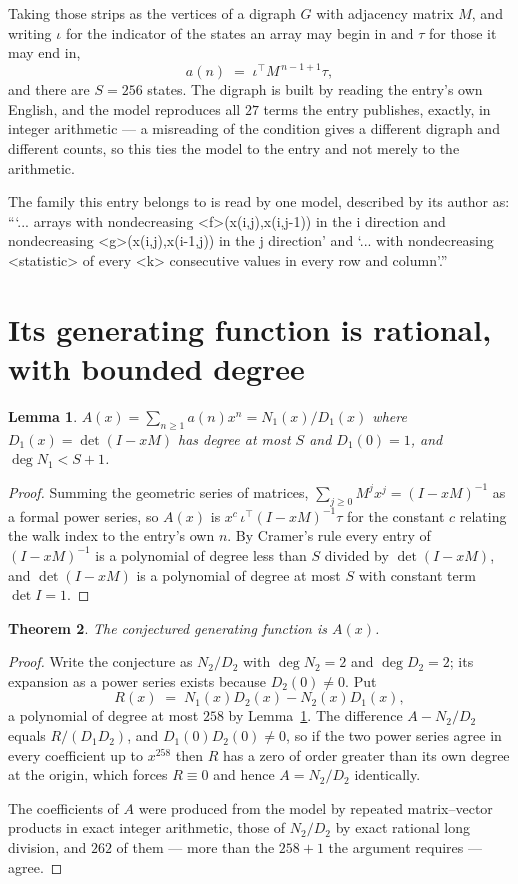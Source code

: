 \documentclass[11pt,a4paper]{article}
\theoremstyle{plain}
\newtheorem{theorem}{Theorem}
\newtheorem{lemma}[theorem]{Lemma}
\theoremstyle{definition}
\begin{document}
Taking those strips as the vertices of a digraph $G$ with adjacency matrix $M$, and writing
$\iota$ for the indicator of the states an array may begin in and $\tau$ for those it may end
in,
\[
a(n)\;=\;\iota^{\!\top}M^{\,n-1+1}\tau ,
\]
and there are $S=256$ states. The digraph is built by reading the entry's own English, and the
model reproduces all $27$ terms the entry publishes, exactly, in integer arithmetic --- a
misreading of the condition gives a different digraph and different counts, so this ties the
model to the entry and not merely to the arithmetic.

The family this entry belongs to is read by one model, described by its author as: ```... arrays with nondecreasing <f>(x(i,j),x(i,j-1)) in the i direction and nondecreasing <g>(x(i,j),x(i-1,j)) in the j direction' and `... with nondecreasing <statistic> of every <k> consecutive values in every row and column'.''


\section{Its generating function is rational, with bounded degree}

\begin{lemma}\label{lem:rat}
$A(x)=\sum_{n\ge1}a(n)x^n=N_1(x)/D_1(x)$ where $D_1(x)=\det(I-xM)$ has degree at most
$S$ and $D_1(0)=1$, and $\deg N_1<S+1$.
\end{lemma}

\begin{proof}
Summing the geometric series of matrices, $\sum_{j\ge0}M^jx^j=(I-xM)^{-1}$ as a formal
power series, so $A(x)$ is $x^{c}\,\iota^{\!\top}(I-xM)^{-1}\tau$ for the constant $c$
relating the walk index to the entry's own $n$. By Cramer's rule every entry of
$(I-xM)^{-1}$ is a polynomial of degree less than $S$ divided by $\det(I-xM)$, and
$\det(I-xM)$ is a polynomial of degree at most $S$ with constant term $\det I=1$.
\end{proof}

\begin{theorem}
The conjectured generating function is $A(x)$.
\end{theorem}

\begin{proof}
Write the conjecture as $N_2/D_2$ with $\deg N_2=2$ and $\deg D_2=2$; its expansion as a
power series exists because $D_2(0)\neq0$. Put
\[
R(x)\;=\;N_1(x)D_2(x)-N_2(x)D_1(x),
\]
a polynomial of degree at most $258$ by Lemma~\ref{lem:rat}. The difference
$A-N_2/D_2$ equals $R/(D_1D_2)$, and $D_1(0)D_2(0)\neq0$, so if the two power series agree in
every coefficient up to $x^{258}$ then $R$ has a zero of order greater than its own
degree at the origin, which forces $R\equiv0$ and hence $A=N_2/D_2$ identically.

The coefficients of $A$ were produced from the model by repeated matrix--vector products in
exact integer arithmetic, those of $N_2/D_2$ by exact rational long division, and $262$
of them --- more than the $258+1$ the argument requires --- agree.
\end{proof}
\end{document}
